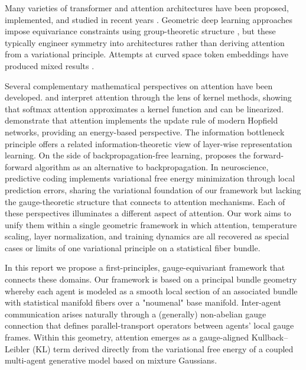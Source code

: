 \documentclass[twoside,11pt]{article}
\begin{document}
Many varieties of transformer and attention architectures have been proposed, implemented, and studied in recent years \citep{fuchs2020se3,thomas2018tensor}. Geometric deep learning approaches impose equivariance constraints using group-theoretic structure \citep{kondor2018generalization,finzi2020generalizing,bronstein2021geometric}, but these typically engineer symmetry into architectures rather than deriving attention from a variational principle. Attempts at curved space token embeddings have produced mixed results \citep{bonnabel2013stochastic,absil2008optimization}.

Several complementary mathematical perspectives on attention have been developed. \citet{tsai2019transformer} and \citet{katharopoulos2020transformers} interpret attention through the lens of kernel methods, showing that softmax attention approximates a kernel function and can be linearized. \citet{ramsauer2021hopfield} demonstrate that attention implements the update rule of modern Hopfield networks, providing an energy-based perspective. The information bottleneck principle \citep{tishby2015deep,shwartz2017opening} offers a related information-theoretic view of layer-wise representation learning. On the side of backpropagation-free learning, \citet{hinton2022forward} proposes the forward-forward algorithm as an alternative to backpropagation. In neuroscience, predictive coding \citep{rao1999predictive,bogacz2017tutorial,millidge2021predictive} implements variational free energy minimization through local prediction errors, sharing the variational foundation of our framework but lacking the gauge-theoretic structure that connects to attention mechanisms. Each of these perspectives illuminates a different aspect of attention. Our work aims to unify them within a single geometric framework in which attention, temperature scaling, layer normalization, and training dynamics are all recovered as special cases or limits of one variational principle on a statistical fiber bundle.

In this report we propose a first-principles, gauge-equivariant framework that connects these domains. Our framework is based on a principal bundle geometry whereby each agent is modeled as a smooth local section of an associated bundle with statistical manifold fibers over a "noumenal" base manifold. Inter-agent communication arises naturally through a (generally) non-abelian gauge connection that defines parallel-transport operators between agents' local gauge frames. Within this geometry, attention emerges as a gauge-aligned Kullback–Leibler (KL) term derived directly from the variational free energy of a coupled multi-agent generative model based on mixture Gaussians.
\end{document}
